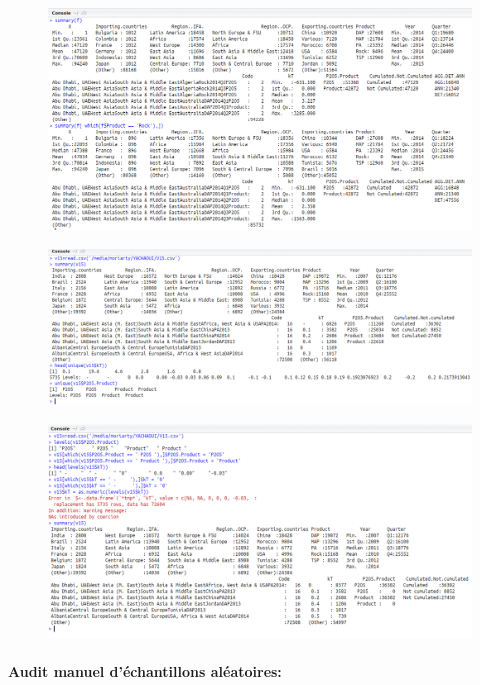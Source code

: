 		\begin{figure}[H]
		\centering
		\includegraphics[scale=0.4]{8}
		\caption{}
		\label{fig:}
	\end{figure}
		\begin{figure}[H]
		\centering
		\includegraphics[scale=0.4]{9}
		\caption{}
		\label{fig:}
	\end{figure}
		\begin{figure}[H]
		\centering
		\includegraphics[scale=0.4]{10}
		\caption{}
		\label{fig:}
	\end{figure}
	\paragraph{Audit manuel d'échantillons aléatoires:}
